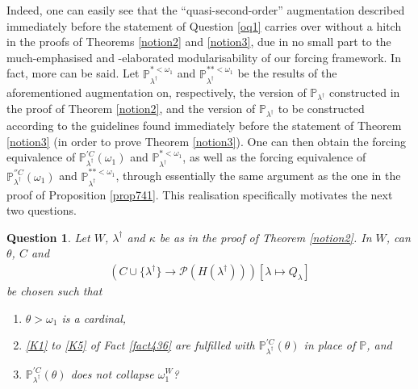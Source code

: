 \documentclass[12pt, twoside]{memoir}
\numberwithin{equation}{section}
\newtheorem{ques}[thm]{Question}
\theoremstyle{definition}
\theoremstyle{remark}
\theoremstyle{definition}
\theoremstyle{definition}
\theoremstyle{definition}
\theoremstyle{remark}
\begin{document}
Indeed, one can easily see that the ``quasi-second-order'' augmentation described immediately before the statement of Question \ref{oq1} carries over without a hitch in the proofs of Theorems \ref{notion2} and \ref{notion3}, due in no small part to the much-emphasised and -elaborated modularisability of our forcing framework. In fact, more can be said. Let $\mathbb{P}^{* < \omega_1}_{\lambda^{\dagger}}$ and $\mathbb{P}^{** < \omega_1}_{\lambda^{\dagger}}$ be the results of the aforementioned augmentation on, respectively, the version of $\mathbb{P}_{\lambda^{\dagger}}$ constructed in the proof of Theorem \ref{notion2}, and the version of $\mathbb{P}_{\lambda^{\dagger}}$ to be constructed according to the guidelines found immediately before the statement of Theorem \ref{notion3} (in order to prove Theorem \ref{notion3}). One can then obtain the forcing equivalence of $\mathbb{P}^{'C}_{\lambda^{\dagger}}(\omega_1)$ and $\mathbb{P}^{* < \omega_1}_{\lambda^{\dagger}}$, as well as the forcing equivalence of $\mathbb{P}^{''C}_{\lambda^{\dagger}}(\omega_1)$ and $\mathbb{P}^{** < \omega_1}_{\lambda^{\dagger}}$, through essentially the same argument as the one in the proof of Proposition \ref{prop741}. This realisation specifically motivates the next two questions.

\begin{ques}\label{oq2}
Let $W$, $\lambda^{\dagger}$ and $\kappa$ be as in the proof of Theorem \ref{notion2}. In $W$, can $\theta$, $C$ and
\begin{gather*}
    (C \cup \{\lambda^{\dagger}\} \longrightarrow \mathcal{P}(H(\lambda^{\dagger}))) [\lambda \mapsto Q_{\lambda}]
\end{gather*}
be chosen such that 
\begin{enumerate}[label=(\arabic*)]
    \item $\theta > \omega_1$ is a cardinal,
    \item \ref{K1} to \ref{K5} of Fact \ref{fact436} are fulfilled with $\mathbb{P}^{'C}_{\lambda^{\dagger}}(\theta)$ in place of $\mathbb{P}$, and
    \item $\mathbb{P}^{'C}_{\lambda^{\dagger}}(\theta)$ does not collapse $\omega_1^W$?
\end{enumerate}
\end{ques}
\end{document}
